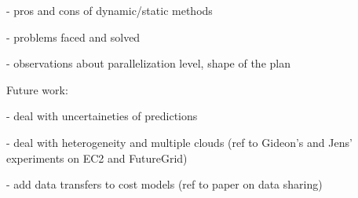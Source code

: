 \documentclass{sig-alternate}
\begin{document}
 - pros and cons of dynamic/static methods
 
 - problems faced and solved
 
 - observations about parallelization level, shape of the plan
 

Future work:

 - deal with uncertaineties of predictions
 
 - deal with heterogeneity and multiple clouds (ref to Gideon's and Jens'
 experiments on EC2 and FutureGrid)
 
 - add data transfers to cost models (ref to paper on data sharing)







\end{document}
